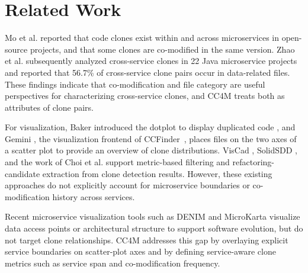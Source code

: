 \documentclass[conference]{IEEEtran}
\begin{document}
\section{Related Work}

Mo et al. \cite{Mo2021ESEM} reported that code clones exist within
and across microservices in open-source projects, and that some
clones are co-modified in the same version. Zhao et al.
\cite{Zhao2022ICPC} subsequently analyzed cross-service clones in 22
Java microservice projects and reported that 56.7\% of cross-service
clone pairs occur in data-related files. These findings indicate that 
co-modification and file category are useful
perspectives for characterizing cross-service clones, and \textsc{CC4M}
treats both as attributes of clone pairs.

For visualization, Baker introduced the dotplot to display duplicated
code \cite{Baker1992Duplicated}, and Gemini \cite{Ueda2002Gemini}, the
visualization frontend of CCFinder~\cite{CCFinder}, places files on the two axes of a
scatter plot to provide an overview of clone distributions. VisCad
\cite{Asaduzzaman2011VisCad}, SolidSDD \cite{Voinea2014SolidSDD}, and
the work of Choi et al. \cite{Choi2011IWSC} support metric-based
filtering and refactoring-candidate extraction from clone detection
results.
However, these existing approaches do not explicitly account for
microservice boundaries or co-modification history across services. 

Recent microservice visualization tools such as DENIM
\cite{Andre2025DENIM} and MicroKarta \cite{Manglaras2024FSE} visualize
data access points or architectural structure to support software
evolution, but do not target clone relationships. \textsc{CC4M} addresses
this gap by overlaying explicit service boundaries on scatter-plot axes
and by defining service-aware clone metrics such as service span and
co-modification frequency.
\end{document}
